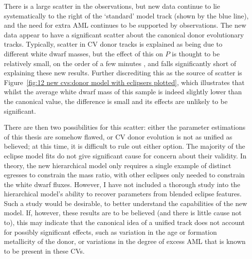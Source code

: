 There is a large scatter in the observations, but new data continue to lie systematically to the right of the `standard' model track (shown by the blue line), and the need for extra AML continues to be supported by observations.
The new data appear to have a significant scatter about the canonical donor evolutionary tracks.
Typically, scatter in CV donor tracks is explained as being due to different white dwarf masses, but the effect of this on $P$ is thought to be relatively small, on the order of a few minutes \citep{goliasch2015}, and falls significantly short of explaining these new results.
Further discrediting this as the source of scatter is Figure~\ref{fig:12 new cvs:donor model with eclipsers plotted}, which illustrates that whilst the average white dwarf mass of this sample is indeed slightly lower than the canonical \citet{pala2020} value, the difference is small and its effects are unlikely to be significant.

There are then two possibilities for this scatter: either the parameter estimations of this thesis are somehow flawed, or CV donor evolution is not as unified as believed; at this time, it is difficult to rule out either option.
The majority of the eclipse model fits do not give significant cause for concern about their validity. In theory, the new hierarchical model only requires a single example of distinct egresses to constrain the mass ratio, with other eclipses only needed to constrain the white dwarf fluxes. However, I have not included a thorough study into the hierarchical model's ability to recover parameters from blended eclipse features. Such a study would be desirable, to better understand the capabilities of the new model.
If, however, these results are to be believed (and there is little cause not to), this may indicate that the canonical idea of a unified track does not account for possibly significant effects, such as variation in the age or formation metallicity of the donor, or variations in the degree of excess AML that is known to be present in these CVs.


